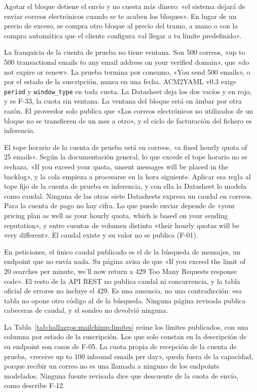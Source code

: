 Agotar el bloque detiene el envío y no cuesta más dinero: «el sistema dejará de
enviar correos electrónicos cuando se te acaben los bloques». En lugar de un precio
de exceso, se compra otro bloque al precio del tramo, a mano o con la compra
automática que el cliente configura «al llegar a tu límite predefinido».

La franquicia de la cuenta de prueba no tiene ventana. Son 500 correos, «up to 500
transactional emails to any email address on your verified domain», que «do not
expire or renew». La prueba termina por consumo, «You send 500 emails», o por el
estado de la suscripción, nunca en una fecha. ACM2YAML v0.3 exige
\texttt{period} y \texttt{window\_type} en toda cuota. La Datasheet deja los dos
vacíos y en rojo, y es F-33, la cuota sin ventana. La ventana del bloque está en
ámbar por otra razón. El proveedor solo publica que «Los correos electrónicos no
utilizados de un bloque no se transfieren de un mes a otro», y el ciclo de
facturación del fichero es inferencia.

El tope horario de la cuenta de prueba está en correos, «a fixed hourly quota of 25
emails». Según la documentación general, lo que excede el tope horario no se
rechaza, «If you exceed your quota, unsent messages will be placed in the backlog», y
la cola empieza a procesarse en la hora siguiente. Aplicar esa regla al tope fijo de
la cuenta de prueba es inferencia, y con ella la Datasheet lo modela como caudal. Ninguna de las otras siete Datasheets expresa un caudal en correos. Para la
cuenta de pago no hay cifra. Lo que puede enviar depende de «your pricing plan as
well as your hourly quota, which is based on your sending reputation», y entre
cuentas de volumen distinto «their hourly quotas will be very different». El caudal
existe y su valor no se publica (F-01).

En peticiones, el único caudal publicado es el de la búsqueda de mensajes, un
endpoint que no envía nada. Su página avisa de que «If you exceed the limit of 20
searches per minute, we'll now return a 429 Too Many Requests response code». El
resto de la API REST no publica caudal ni concurrencia, y la tabla oficial de errores
no incluye el 429. Es una ausencia, no una contradicción: esa tabla no opone otro
código al de la búsqueda. Ninguna página revisada publica cabeceras de caudal, y el
sondeo no devolvió ninguna.

La Tabla~\ref{tab:hallazgos:mailchimp:limites} reúne los límites publicados, con una
columna por estado de la suscripción. Los que solo constan en la descripción de su endpoint
son casos de F-05. La cuota propia de recepción de la cuenta de prueba, «receive up to 100
inbound emails per day», queda fuera de la capacidad, porque recibir un correo no es
una llamada a ninguno de los endpoints modelados. Ninguna fuente revisada dice que
descuente de la cuota de envío, como describe F-12.

